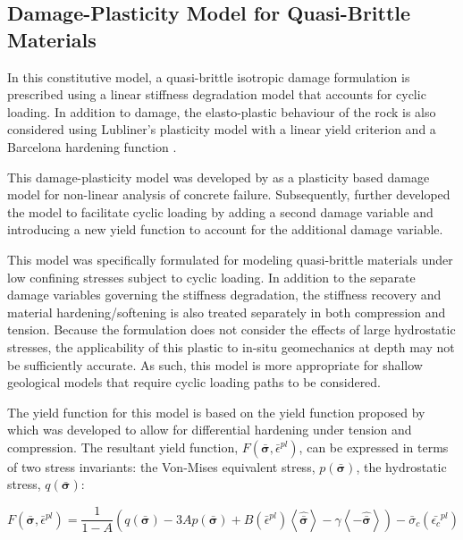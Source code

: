 \subsection{Damage-Plasticity Model for Quasi-Brittle Materials}

In this constitutive model, a quasi-brittle isotropic damage formulation is prescribed using a linear stiffness degradation model that accounts for cyclic loading. In addition to damage, the elasto-plastic behaviour of the rock is also considered using Lubliner's plasticity model with a linear yield criterion and a Barcelona hardening function \citep{lubliner_plastic-damage_1989}. 

This damage-plasticity model was developed by \citet{lubliner_plastic-damage_1989} as a plasticity based damage model for non-linear analysis of concrete failure. Subsequently, \citet{lee_plastic-damage_1998} further developed the model to facilitate cyclic loading by adding a second damage variable and introducing a new yield function to account for the additional damage variable. 

This model was specifically formulated for modeling quasi-brittle materials under low confining stresses subject to cyclic loading. In addition to the separate damage variables governing the stiffness degradation, the stiffness recovery and material hardening/softening is also treated separately in both compression and tension. Because the formulation does not consider the effects of large hydrostatic stresses, the applicability of this plastic to in-situ geomechanics at depth may not be sufficiently accurate. As such, this model is more appropriate for shallow geological models that require cyclic loading paths to be considered.

The yield function for this model is based on the yield function proposed by \citet{lee_plastic-damage_1998} which was developed to allow for differential hardening under tension and compression. The resultant yield function, $F\left(\bar{\boldsymbol{\sigma}},\bar{\epsilon}^{pl}\right)$, can be expressed in terms of two stress invariants: the Von-Mises equivalent stress, $p\left(\bar{\boldsymbol{\sigma}}\right)$, the hydrostatic stress, $q\left(\bar{\boldsymbol{\sigma}}\right)$:

\begin{equation}
    F
    \left(\bar{\boldsymbol{\sigma}},\bar{\epsilon}^{pl}\right)
    =
    \frac{1}{1-A}
    \left(
        q\left(\bar{\boldsymbol{\sigma}}\right)-3A p\left(\bar{\boldsymbol{\sigma}}\right)+B\left(\bar{\epsilon}^{pl}\right)
        \left\langle\hat{\bar{\boldsymbol{\sigma}}}\right\rangle-\gamma\left\langle-\hat{\bar{\boldsymbol{\sigma}}}\right\rangle\right)
    -\bar{\sigma}_{c}
    \left(
        \bar{\epsilon_{c}}^{pl}
    \right)
\label{eqn:const10c}
\end{equation}


